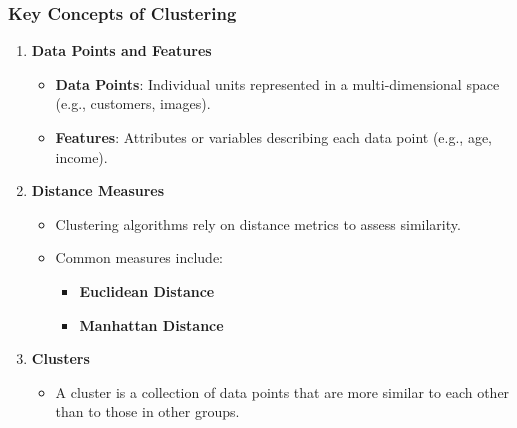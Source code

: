 \documentclass[aspectratio=169]{beamer}
\begin{document}
\begin{frame}[fragile]
    \frametitle{Key Concepts of Clustering}
    \begin{enumerate}
        \item \textbf{Data Points and Features}
            \begin{itemize}
                \item \textbf{Data Points}: Individual units represented in a multi-dimensional space (e.g., customers, images).
                \item \textbf{Features}: Attributes or variables describing each data point (e.g., age, income).
            \end{itemize}
        \item \textbf{Distance Measures}
            \begin{itemize}
                \item Clustering algorithms rely on distance metrics to assess similarity.
                \item Common measures include:
                    \begin{itemize}
                        \item \textbf{Euclidean Distance}
                        \item \textbf{Manhattan Distance}
                    \end{itemize}
            \end{itemize}
        \item \textbf{Clusters}
            \begin{itemize}
                \item A cluster is a collection of data points that are more similar to each other than to those in other groups.
            \end{itemize}
    \end{enumerate}
\end{frame}
\end{document}
